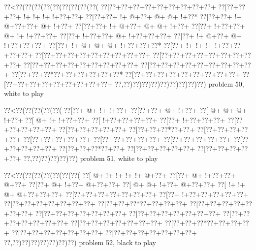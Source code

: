 \vbox{\vbox{\goo
\0??<\0??(\0??(\0??(\0??(\0??(\0??(\0??(\0??(\0??(
\0??[\0??+\0??+\0??+\0??+\0??+\0??+\0??+\0??+\0??+
\0??[\0??+\0??+\0??+\- !+\- !+\- !+\- !+\0??+\0??+
\0??[\0??+\0??+\- !+\- @+\0??+\- @+\- @+\- !+\0??*
\0??[\0??+\0??+\- !+\- @+\0??+\0??+\- @+\- !+\0??+
\0??[\0??+\0??+\- !+\- @+\0??+\- @+\- @+\- !+\0??+
\0??[\0??+\- !+\0??+\0??+\- @+\- !+\- !+\0??+\0??+
\0??[\0??+\- !+\0??+\0??+\- @+\- !+\0??+\0??+\0??+
\0??[\0??+\- !+\- @+\0??+\- @+\- !+\0??+\0??+\0??+
\0??[\0??+\- !+\- @+\- @+\- @+\- !+\0??+\0??+\0??*
\0??[\0??+\- !+\- !+\- !+\- !+\0??+\0??+\0??+\0??+
\0??[\0??+\0??+\0??+\0??+\0??+\0??+\0??+\0??+\0??+
\0??[\0??+\0??+\0??+\0??+\0??+\0??+\0??+\0??+\0??+
\0??[\0??+\0??+\0??+\0??+\0??+\0??+\0??+\0??+\0??+
\0??[\0??+\0??+\0??+\0??+\0??+\0??+\0??+\0??+\0??+
\0??[\0??+\0??+\0??*\0??+\0??+\0??+\0??+\0??+\0??*
\0??[\0??+\0??+\0??+\0??+\0??+\0??+\0??+\0??+\0??+
\0??[\0??+\0??+\0??+\0??+\0??+\0??+\0??+\0??+\0??+
\0??,\0??)\0??)\0??)\0??)\0??)\0??)\0??)\0??)\0??)
}
\hfil problem 50, white to play\hfil\break
}

\vbox{\vbox{\goo
\0??<\0??(\0??(\0??(\0??(\0??(
\0??[\0??+\- @+\- !+\- !+\0??+
\0??[\0??+\0??+\- @+\- !+\0??+
\0??[\- @+\- @+\- @+\- !+\0??+
\0??[\- @+\- !+\- !+\0??+\0??+
\0??[\- !+\0??+\0??+\0??+\0??+
\0??[\0??+\- !+\0??+\0??+\0??+
\0??[\0??+\0??+\0??+\0??+\0??+
\0??[\0??+\0??+\0??+\0??+\0??+
\0??[\0??+\0??+\0??*\0??+\0??+
\0??[\0??+\0??+\0??+\0??+\0??+
\0??[\0??+\0??+\0??+\0??+\0??+
\0??[\0??+\0??+\0??+\0??+\0??+
\0??[\0??+\0??+\0??+\0??+\0??+
\0??[\0??+\0??+\0??+\0??+\0??+
\0??[\0??+\0??+\0??*\0??+\0??+
\0??[\0??+\0??+\0??+\0??+\0??+
\0??[\0??+\0??+\0??+\0??+\0??+
\0??,\0??)\0??)\0??)\0??)\0??)
}
\hfil problem 51, white to play\hfil\break
}

\vbox{\vbox{\goo
\0??<\0??(\0??(\0??(\0??(\0??(\0??(\0??(
\0??[\- @+\- !+\- !+\- !+\- !+\- @+\0??+
\0??[\0??+\- @+\- !+\0??+\0??+\- @+\0??+
\0??[\0??+\- @+\- !+\0??+\- @+\0??+\0??+
\0??[\- @+\- @+\- !+\0??+\- @+\0??+\0??+
\0??[\- !+\- !+\- @+\- @+\0??+\0??+\0??+
\0??[\0??+\0??+\0??+\0??+\0??+\0??+\0??+
\0??[\0??+\- !+\0??+\0??+\0??+\0??+\0??+
\0??[\0??+\0??+\0??+\0??+\0??+\0??+\0??+
\0??[\0??+\0??+\0??*\0??+\0??+\0??+\0??+
\0??[\0??+\0??+\0??+\0??+\0??+\0??+\0??+
\0??[\0??+\0??+\0??+\0??+\0??+\0??+\0??+
\0??[\0??+\0??+\0??+\0??+\0??+\0??+\0??+
\0??[\0??+\0??+\0??+\0??+\0??+\0??+\0??+
\0??[\0??+\0??+\0??+\0??+\0??+\0??+\0??+
\0??[\0??+\0??+\0??*\0??+\0??+\0??+\0??+
\0??[\0??+\0??+\0??+\0??+\0??+\0??+\0??+
\0??[\0??+\0??+\0??+\0??+\0??+\0??+\0??+
\0??,\0??)\0??)\0??)\0??)\0??)\0??)\0??)
}
\hfil problem 52, black to play\hfil\break
}

